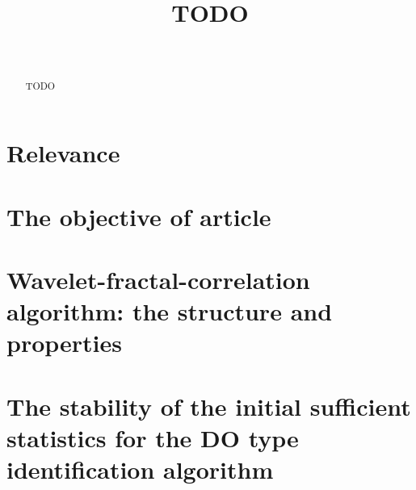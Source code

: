 \documentclass[
11pt,%
tightenlines,%
twoside,%
onecolumn,%
nofloats,%
nobibnotes,%
nofootinbib,%
superscriptaddress,%
noshowpacs,%
centertags]%
{revtex4}
\begin{document}

\title{TODO}

\author{~}
 




\begin{abstract}
TODO
\end{abstract}



\maketitle


\section{Relevance}



\section{The objective of article}



\section{Wavelet-fractal-correlation algorithm: the structure and properties}



\section{The stability of the initial sufficient statistics for the DO type identification algorithm}
\end{document}

